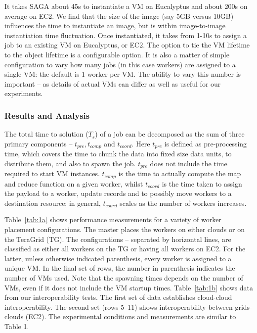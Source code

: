 \documentclass[3p,twocolumn]{elsarticle}
\begin{document}
It takes SAGA about 45s to instantiate a VM on Eucalyptus and about
200s on average on EC2.  We find that the size of the image (say 5GB
versus 10GB) influences the time to instantiate an image, but is
within image-to-image instantiation time fluctuation.  Once
instantiated, it takes from 1-10s to assign a job to an existing VM on
Eucalyptus, or EC2.  The option to tie the VM lifetime to the
 object lifetime is a configurable option.  It
is also a matter of simple configuration to vary how many jobs (in
this case workers) are assigned to a single VM:  the default is 1
worker per VM.  The ability to vary this number is important -- as
details of actual VMs can differ as well as useful for our
experiments.


\subsubsection*{Results and Analysis}

The total time to solution ($T_s$) of a \sagamapreduce job can be
decomposed as the sum of three primary components -- $t_{pre},
t_{comp}$ and $t_{coord}$.  Here $t_{pre}$ is defined as
pre-processing time, which covers the time to chunk the data into
fixed size data units, to distribute them, and also to spawn the job.
$t_{pre}$ does not include the time required to start VM instances.
$t_{comp}$ is the time to actually compute the map and reduce function
on a given worker, whilst $t_{coord}$ is the time taken to assign the
payload to a worker, update records and to possibly move workers to a
destination resource; in general, $t_{coord}$ scales as the number of
workers increases.

Table~\ref{tab:1a} shows performance measurements for a variety of
worker placement configurations.  The master places the workers on
either clouds or on the TeraGrid (TG). The configurations -- separated
by horizontal lines, are classified as either all workers on the TG or
having all workers on EC2. For the latter, unless otherwise indicated
parenthesis, every worker is assigned to a unique VM. In the final set
of rows, the number in parenthesis indicates the number of VMs used.
Note that the spawning times depends on the number of VMs, even if it
does not include the VM startup times.  Table~\ref{tab:1b} shows data
from our interoperability tests.  The first set of data establishes
cloud-cloud interoperability. The second set (rows 5--11) shows
interoperability between grids-clouds (EC2).  The experimental
conditions and measurements are similar to Table 1.
\end{document}

